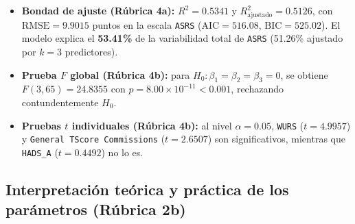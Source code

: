 \documentclass[11pt,letterpaper]{article}
\begin{document}
\begin{table}[H]
  \centering
  \caption{Estimadores MCO, errores estándar, pruebas $t$ ($gl = 65$) e IC al 95\% ($n = 69$).}
  \label{tab:coef}
\end{table}

\begin{itemize}
  \item \textbf{Bondad de ajuste (Rúbrica 4a):} $R^2 = 0.5341$ y $R^2_{\text{ajustado}} = 0.5126$, con $\text{RMSE} = 9.9015$ puntos en la escala \texttt{ASRS} ($\text{AIC} = 516.08$, $\text{BIC} = 525.02$). El modelo explica el \textbf{53.41\%} de la variabilidad total de \texttt{ASRS} (51.26\% ajustado por $k = 3$ predictores).
  \item \textbf{Prueba $F$ global (Rúbrica 4b):} para $H_0: \beta_1 = \beta_2 = \beta_3 = 0$, se obtiene $F(3, 65) = 24.8355$ con $p = 8.00 \times 10^{-11} < 0.001$, rechazando contundentemente $H_0$.
  \item \textbf{Pruebas $t$ individuales (Rúbrica 4b):} al nivel $\alpha = 0.05$, \texttt{WURS} ($t = 4.9957$) y \texttt{General TScore Commissions} ($t = 2.6507$) son significativos, mientras que \texttt{HADS\_A} ($t = 0.4492$) no lo es.
\end{itemize}

\subsection{Interpretación teórica y práctica de los parámetros (Rúbrica 2b)}
\end{document}
